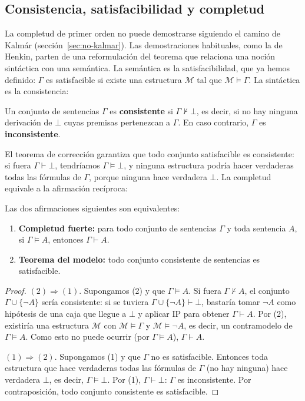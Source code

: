 \subsection{Consistencia, satisfacibilidad y completud}\label{sec:consistencia-satisfacibilidad}

La completud de primer orden no puede demostrarse siguiendo el camino de Kalmár (sección~\ref{sec:no-kalmar}). Las demostraciones habituales, como la de Henkin, parten de una reformulación del teorema que relaciona una noción sintáctica con una semántica. La semántica es la satisfacibilidad, que ya hemos definido: $\Gamma$ es satisfacible si existe una estructura $\mathcal{M}$ tal que $\mathcal{M} \models \Gamma$. La sintáctica es la consistencia:

\begin{definition}[Consistencia]
Un conjunto de sentencias $\Gamma$ es \textbf{consistente} si $\Gamma \nvdash \bot$, es decir, si no hay ninguna derivación de $\bot$ cuyas premisas pertenezcan a $\Gamma$. En caso contrario, $\Gamma$ es \textbf{inconsistente}.
\end{definition}

El teorema de corrección garantiza que todo conjunto satisfacible es consistente: si fuera $\Gamma \vdash \bot$, tendríamos $\Gamma \models \bot$, y ninguna estructura podría hacer verdaderas todas las fórmulas de $\Gamma$, porque ninguna hace verdadera $\bot$. La completud equivale a la afirmación recíproca:

\begin{lemma}\label{lema_reduccion}
Las dos afirmaciones siguientes son equivalentes:
\begin{enumerate}
    \item \textbf{Completud fuerte:} para todo conjunto de sentencias $\Gamma$ y toda sentencia $A$, si $\Gamma \models A$, entonces $\Gamma \vdash A$.
    \item \textbf{Teorema del modelo:} todo conjunto consistente de sentencias es satisfacible.
\end{enumerate}
\end{lemma}

\begin{proof}
$(2) \Rightarrow (1)$. Supongamos (2) y que $\Gamma \models A$. Si
fuera $\Gamma \nvdash A$, el conjunto $\Gamma \cup \{\neg A\}$ sería
consistente: si se tuviera $\Gamma \cup \{\neg A\} \vdash \bot$,
bastaría tomar $\neg A$ como hipótesis de una caja que llegue a $\bot$
y aplicar IP para obtener $\Gamma \vdash A$. Por (2), existiría una
estructura $\mathcal{M}$ con $\mathcal{M} \models \Gamma$ y
$\mathcal{M} \models \neg A$, es decir, un contramodelo de $\Gamma
\models A$. Como esto no puede ocurrir (por $\Gamma\models A$),
$\Gamma \vdash A$. 

$(1) \Rightarrow (2)$. Supongamos (1) y que $\Gamma$ no es satisfacible. Entonces toda estructura que hace verdaderas todas las fórmulas de $\Gamma$ (no hay ninguna) hace verdadera $\bot$, es decir, $\Gamma \models \bot$. Por (1), $\Gamma \vdash \bot$: $\Gamma$ es inconsistente. Por contraposición, todo conjunto consistente es satisfacible.
\end{proof}

